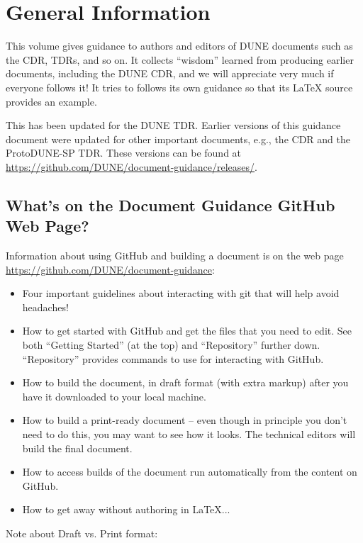 \chapter{General Information}
\label{ch:gen}

This volume gives guidance to authors and editors of DUNE documents such as the CDR, TDRs, and so on. It collects ``wisdom'' learned from 
producing earlier documents, including the DUNE CDR, and we will appreciate 
very much if everyone follows it!  It tries to follows its own guidance so that its \LaTeX{} source
provides an example.  

This has been updated for the DUNE TDR. Earlier versions of this guidance document were updated for other important documents, e.g., the CDR and the ProtoDUNE-SP TDR.  These versions can be found at \url{https://github.com/DUNE/document-guidance/releases/}.


\section{What's on the Document Guidance GitHub Web Page?}
\label{sec:gen-webpage}

Information about using GitHub and building a document is on the web page \url{https://github.com/DUNE/document-guidance}:

\begin{itemize}
\item Four important guidelines about interacting with git that will help avoid headaches!
\item How to get started with GitHub and get the files that you need to edit. See both ``Getting Started'' (at the top) and ``Repository'' further down.  ``Repository'' provides commands to use for interacting with GitHub.
\item How to build the document, in draft format (with extra markup) after you have it downloaded to your local machine.
\item How to build a print-ready document -- even though in principle you don't need to do this, you may want to see how it looks. The technical editors will build the final document.
\item How to access builds of the document run automatically from the content on GitHub.
\item How to get away without authoring in \LaTeX{}...
\end{itemize}

Note about Draft vs. Print format: 

